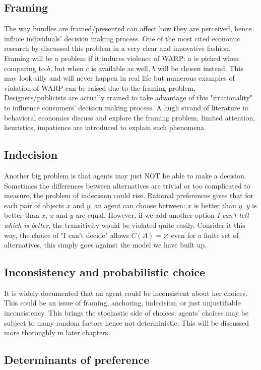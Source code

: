 \subsection{Framing}
The way bundles are framed/presented can affect how they are perceived, hence influce individuals' decision making process. One of the most cited economic research by \citet{kai1979prospect} discussed this problem in a very clear and
innovative fashion. Framing will be a problem if it induces violence of WARP: $a$ is picked when comparing to $b$, but when $c$ is available as well, $b$ will be chosen instead. This may look silly and will never happen in real life but 
numerous examples of violation of WARP can be raised due to the framing problem. Designers/publicists are actually trained to take advantage of this "irrationality" to influence consumers' decision making process. A hugh strand of literature
in behavioral economics discuss and explore the framing problem, limited attention, heuristics, impatience are introduced to explain such phenomena. 

\subsection{Indecision}
Another big problem is that agents may just NOT be able to make a decision. Sometimes the differences between alternatives are trivial or too complicated to measure, the problem of indecision could rise. Rational preferences gives that for each pair of objects $x$ and $y$, an agent can 
choose between: $x$ is better than $y$, $y$ is better than $x$, $x$ and $y$ are equal. However, if we add another option \textit{I can't tell which is better}, the transitivity would be violated quite easily. Consider it this way, the choice of "I can't decide" allows $C(A)=\varnothing$ even
for a finite set of alternatives, this simply goes against the model we have built up.

\subsection{Inconsistency and probabilistic choice}
It is widely documented that an agent could be inconsistent about her choices. This could be an issue of framing, anchoring, indecision, or just unjustifiable inconsistency. This brings the stochastic side of choices: agents' choices may be subject to many random factors
hence not deterministic. This will be discussed more thoroughly in later chapters.

\subsection{Determinants of preference}

